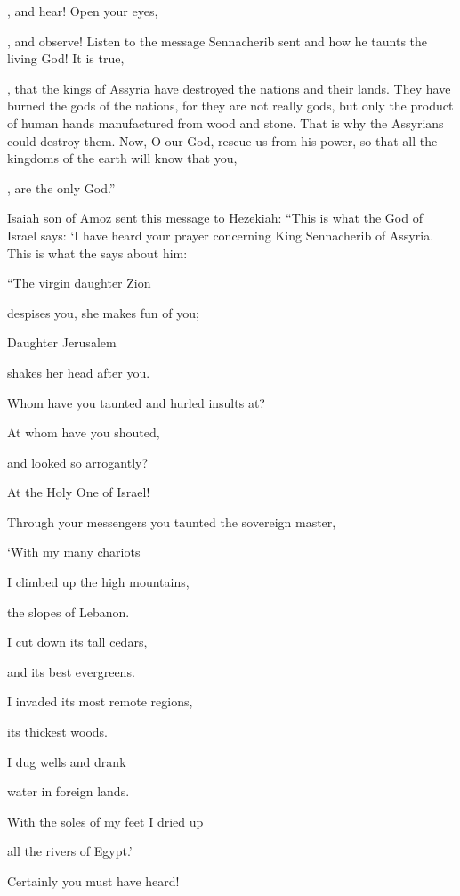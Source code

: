 {{}, and hear! Open
your eyes,

{}, and observe! Listen
to the message
Sennacherib
sent
and how he taunts
the living
God!
It is true,

{}, that the kings
of Assyria
have destroyed
the nations
and their lands.
They
have burned
the gods
of the nations,
for
they
are not
really gods,
but only
the product
of human
hands
manufactured from wood
and stone.
That
is why the Assyrians could destroy
them.
Now,
O
{}
our God,
rescue
us
from his power,
so that all
the kingdoms
of the earth
will know
that
you,

{}, are the only
God.”
\par }{\PP {}Isaiah
son
of Amoz
sent
this message to
Hezekiah: “This is what
the {}
God
of Israel
says: ‘I have
heard
your prayer
concerning King
Sennacherib
of Assyria.
This
is what
the {}
says
about him:

\par }{\Q “The virgin
daughter
Zion
\par }{\Q despises
you, she makes fun
of you;
\par }{\Q Daughter
Jerusalem
\par }{\Q shakes
her head
after you.
\par }{\Q {}Whom
have you taunted
and hurled insults
at?
\par }{\Q At whom
have you shouted,
\par }{\Q and looked
so arrogantly?

\par }{\Q At the Holy One
of Israel!
\par }{\Q {}Through
your messengers
you taunted
the sovereign
master,

\par }{\Q ‘With my many chariots
\par }{\Q I
climbed up
the high
mountains,
\par }{\Q the slopes
of Lebanon.
\par }{\Q I cut down
its tall
cedars,
\par }{\Q and its best
evergreens.
\par }{\Q I invaded
its most remote
regions,
\par }{\Q its thickest
woods.
\par }{\Q {}I
dug wells
and drank
\par }{\Q water
in foreign
lands.
\par }{\Q With the soles
of my feet I dried up
\par }{\Q all
the rivers
of Egypt.’
\par }{\Q Certainly
you must have heard!

}

